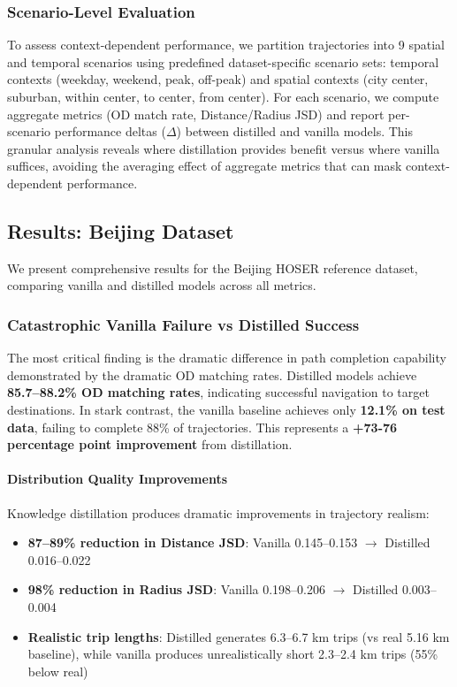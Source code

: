 \subsubsection{Scenario-Level Evaluation}

To assess context-dependent performance, we partition trajectories into 9 spatial and temporal scenarios using predefined dataset-specific scenario sets: temporal contexts (weekday, weekend, peak, off-peak) and spatial contexts (city center, suburban, within center, to center, from center). For each scenario, we compute aggregate metrics (OD match rate, Distance/Radius JSD) and report per-scenario performance deltas ($\Delta$) between distilled and vanilla models. This granular analysis reveals where distillation provides benefit versus where vanilla suffices, avoiding the averaging effect of aggregate metrics that can mask context-dependent performance.

\subsection{Results: Beijing Dataset}
\label{sec:eval-beijing}

We present comprehensive results for the Beijing HOSER reference dataset, comparing vanilla and distilled models across all metrics.

\subsubsection{Catastrophic Vanilla Failure vs Distilled Success}

The most critical finding is the dramatic difference in path completion capability demonstrated by the dramatic OD matching rates. Distilled models achieve \textbf{85.7--88.2\% OD matching rates}, indicating successful navigation to target destinations. In stark contrast, the vanilla baseline achieves only \textbf{12.1\% on test data}, failing to complete 88\% of trajectories. This represents a \textbf{+73-76 percentage point improvement} from distillation.

\paragraph{Distribution Quality Improvements}
Knowledge distillation produces dramatic improvements in trajectory realism:
\begin{itemize}[leftmargin=*,noitemsep]
    \item \textbf{87--89\% reduction in Distance JSD}: Vanilla 0.145--0.153 $\to$ Distilled 0.016--0.022
    \item \textbf{98\% reduction in Radius JSD}: Vanilla 0.198--0.206 $\to$ Distilled 0.003--0.004
    \item \textbf{Realistic trip lengths}: Distilled generates 6.3--6.7 km trips (vs real 5.16 km baseline), while vanilla produces unrealistically short 2.3--2.4 km trips (55\% below real)
\end{itemize}

